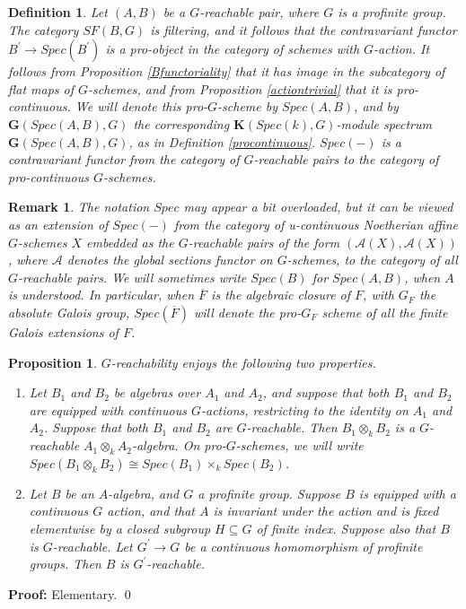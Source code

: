 \documentclass[11pt]{article}
\newcommand\mc{\mathcal}
\def \bK{\mathbf K}
\newcommand\mfk{\mathbf G}
\newtheorem{Proposition}{Proposition}[section]
\newtheorem{Definition}{Definition}[section]
\newtheorem{Remark}{Remark}[section]
\newenvironment{Proof}{\par\noindent\textbf{Proof:}}
{\qed}
\begin{document}
\begin{Definition}\label{bigdefinition} Let $(A,B)$ be a $G$-reachable pair, where $G$ is a profinite group.  
The category $SF(B,G)$ is filtering, and it follows that the contravariant functor $B^{\prime} \rightarrow Spec(B^{\prime})$ is a pro-object in the category of schemes with $G$-action. It follows from Proposition \ref{Bfunctoriality}  that it has image in the subcategory of flat maps of $G$-schemes, and from Proposition \ref{actiontrivial} that it is pro-continuous.  We will denote this pro-$G$-scheme by $Spec(A,B) $, and by $\mfk(Spec(A,B ),G)$ the corresponding $\bK(Spec(k),G)$-module spectrum $\mfk (Spec(A,B), G)$, as in Definition \ref{procontinuous}.  $Spec(-)$ is a contravariant functor from the category of $G$-reachable pairs to the category of pro-continuous $G$-schemes.  
\end{Definition}
\begin{Remark}
    The notation $Spec$ may appear a bit overloaded, but it can be viewed as an extension of $Spec(-)$ from the category of u-continuous Noetherian affine  $G$-schemes $X$ embedded as the $G$-reachable pairs of the form $(\mc{A}(X), \mc{A}(X))$, where $\mc{A}$ denotes the global sections functor on $G$-schemes, to the category of all $G$-reachable pairs. We will sometimes write $Spec(B)$ for $Spec(A,B)$, when $A$  is understood.  In particular, when $\overline{F}$ is the algebraic closure of $F$, with $G_F$ the absolute Galois group, $Spec(\overline{F})$ will denote the pro-$G_F$ scheme of all the finite Galois extensions of $F$.  
\end{Remark}


\begin{Proposition} \label{simpleproperties} $G$-reachability enjoys the following two properties. 
   \begin{enumerate}
       
\item{Let $B_1$ and $B_2$ be algebras over $A_1$ and $A_2$, and suppose that both $B_1$ and $B_2$ are equipped with continuous $G$-actions, restricting to the identity on $A_1$ and $A_2$.   Suppose that both $B_1$ and $B_2$ are $G$-reachable.  Then $B_1 \otimes _k B_2$ is a $G$-reachable $A_1 \otimes _k A_2$-algebra. On pro-$G$-schemes, we will write $Spec(B_1 \otimes _k B_2) \cong Spec(B_1) \times _k Spec(B_2) $.  }
\item{Let $B$ be an $A$-algebra, and $G$ a profinite group.  Suppose $B$ is equipped with a continuous $G$ action, and that $A$ is invariant under the action and is fixed elementwise by a closed subgroup $H \subseteq G$  of finite index.   Suppose also that $B$ is $G$-reachable.   Let $G^{\prime}\rightarrow   G$ be a continuous homomorphism of profinite groups.  Then $B$ is $G^{\prime}$-reachable.  }
   \end{enumerate}
\end{Proposition}
\begin{Proof}
    Elementary. 
\end{Proof}
\end{document}
